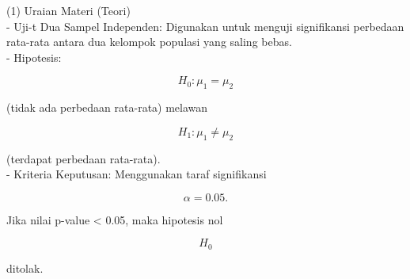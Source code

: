 \documentclass{article}
\newenvironment{eulernotebook}{\par}{\par}
\newenvironment{eulercomment}{\par\medskip}{\par\medskip}
\newenvironment{eulerformula}{}{}
\begin{document}
\begin{eulernotebook}
\begin{eulercomment}
\begin{eulercomment}
\begin{eulercomment}
\begin{eulercomment}
\begin{eulercomment}
\begin{eulercomment}
\begin{eulercomment}
(1) Uraian Materi (Teori)\\
- Uji-t Dua Sampel Independen: Digunakan untuk menguji signifikansi
perbedaan rata-rata antara dua kelompok populasi yang saling bebas.\\
- Hipotesis:\\
\end{eulercomment}
\begin{eulerformula}
\[
H_0: \mu_1 = \mu_2
\]
\end{eulerformula}
\begin{eulercomment}
(tidak ada perbedaan rata-rata) melawan\\
\end{eulercomment}
\begin{eulerformula}
\[
H_1: \mu_1 \ne \mu_2
\]
\end{eulerformula}
\begin{eulercomment}
(terdapat perbedaan rata-rata).\\
- Kriteria Keputusan: Menggunakan taraf signifikansi\\
\end{eulercomment}
\begin{eulerformula}
\[
\alpha = 0.05.
\]
\end{eulerformula}
\begin{eulercomment}
Jika nilai p-value \textless{} 0.05, maka hipotesis nol\\
\end{eulercomment}
\begin{eulerformula}
\[
H_0
\]
\end{eulerformula}
\begin{eulercomment}
ditolak.


\end{eulercomment}
\end{eulercomment}
\end{eulercomment}
\end{eulercomment}
\end{eulercomment}
\end{eulercomment}
\end{eulercomment}
\end{eulernotebook}
\end{document}
